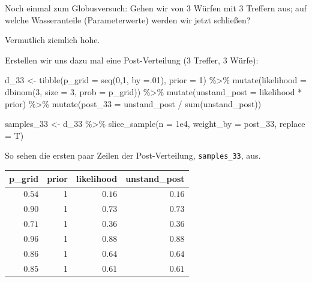 \documentclass[
  a4paper,
  DIV=11]{scrreprt}
\newenvironment{Shaded}{\begin{snugshade}}{\end{snugshade}}
\newcommand{\AttributeTok}[1]{\textcolor[rgb]{0.40,0.45,0.13}{#1}}
\newcommand{\DecValTok}[1]{\textcolor[rgb]{0.68,0.00,0.00}{#1}}
\newcommand{\FloatTok}[1]{\textcolor[rgb]{0.68,0.00,0.00}{#1}}
\newcommand{\FunctionTok}[1]{\textcolor[rgb]{0.28,0.35,0.67}{#1}}
\newcommand{\NormalTok}[1]{\textcolor[rgb]{0.00,0.23,0.31}{#1}}
\newcommand{\OtherTok}[1]{\textcolor[rgb]{0.00,0.23,0.31}{#1}}
\newcommand{\SpecialCharTok}[1]{\textcolor[rgb]{0.37,0.37,0.37}{#1}}
\theoremstyle{definition}
\theoremstyle{remark}
\begin{document}
Noch einmal zum Globusversuch: Gehen wir von 3 Würfen mit 3 Treffern
aus; auf welche Wasseranteile (Parameterwerte) werden wir jetzt
schließen?

Vermutlich ziemlich hohe.

Erstellen wir uns dazu mal eine Post-Verteilung (3 Treffer, 3 Würfe):

\begin{Shaded}
\begin{Highlighting}[]
\NormalTok{d\_33 }\OtherTok{\textless{}{-}} 
  \FunctionTok{tibble}\NormalTok{(}\AttributeTok{p\_grid =} \FunctionTok{seq}\NormalTok{(}\DecValTok{0}\NormalTok{,}\DecValTok{1}\NormalTok{, }\AttributeTok{by =}\NormalTok{.}\DecValTok{01}\NormalTok{),}
         \AttributeTok{prior =} \DecValTok{1}\NormalTok{) }\SpecialCharTok{\%\textgreater{}\%} 
  \FunctionTok{mutate}\NormalTok{(}\AttributeTok{likelihood =} \FunctionTok{dbinom}\NormalTok{(}\DecValTok{3}\NormalTok{, }\AttributeTok{size =} \DecValTok{3}\NormalTok{, }\AttributeTok{prob =}\NormalTok{ p\_grid)) }\SpecialCharTok{\%\textgreater{}\%} 
  \FunctionTok{mutate}\NormalTok{(}\AttributeTok{unstand\_post =}\NormalTok{ likelihood }\SpecialCharTok{*}\NormalTok{ prior) }\SpecialCharTok{\%\textgreater{}\%} 
  \FunctionTok{mutate}\NormalTok{(}\AttributeTok{post\_33  =}\NormalTok{ unstand\_post }\SpecialCharTok{/} \FunctionTok{sum}\NormalTok{(unstand\_post)) }

\NormalTok{samples\_33 }\OtherTok{\textless{}{-}} 
\NormalTok{  d\_33 }\SpecialCharTok{\%\textgreater{}\%} 
    \FunctionTok{slice\_sample}\NormalTok{(}\AttributeTok{n =} \FloatTok{1e4}\NormalTok{, }
                 \AttributeTok{weight\_by =}\NormalTok{ post\_33, }
                 \AttributeTok{replace =}\NormalTok{ T)}
\end{Highlighting}
\end{Shaded}

So sehen die ersten paar Zeilen der Post-Verteilung,
\texttt{samples\_33}, aus.

\begin{longtable}{rrrr}
\toprule
p\_grid & prior & likelihood & unstand\_post \\ 
\midrule
$0.54$ & 1 & $0.16$ & $0.16$ \\ 
$0.90$ & 1 & $0.73$ & $0.73$ \\ 
$0.71$ & 1 & $0.36$ & $0.36$ \\ 
$0.96$ & 1 & $0.88$ & $0.88$ \\ 
$0.86$ & 1 & $0.64$ & $0.64$ \\ 
$0.85$ & 1 & $0.61$ & $0.61$ \\ 
\bottomrule
\end{longtable}
\end{document}
